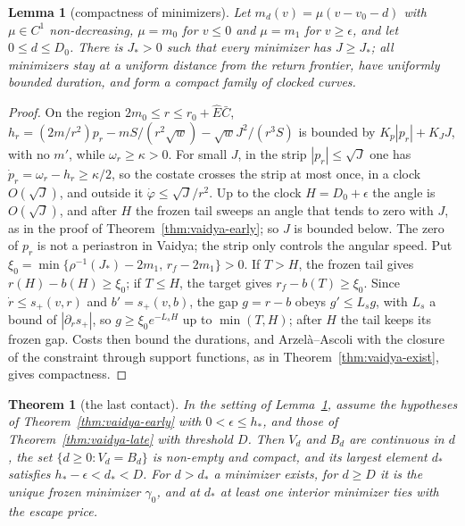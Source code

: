 \documentclass[aip,jmp,amsmath,amssymb,reprint]{revtex4-2}
\newcommand{\Ehat}{\hat E}
\theoremstyle{plain}
\newtheorem{theorem}{Theorem}
\newtheorem{lemma}[proposition]{Lemma}
\theoremstyle{definition}
\begin{document}
\begin{lemma}[compactness of minimizers]\label{lem:vaidya-compact}
Let $m_d(v)=\mu(v-v_0-d)$ with $\mu\in C^1$ non-decreasing, $\mu=m_0$ for $v\le0$ and $\mu=m_1$ for $v\ge\epsilon$, and
let $0\le d\le D_0$. There is $J_*>0$ such that every minimizer has $J\ge J_*$; all minimizers stay at a uniform
distance from the return frontier, have uniformly bounded duration, and form a compact family of clocked
curves.
\end{lemma}

\begin{proof}
On the region $2m_0\le r\le r_0+\Ehat\bar C$,
$h_r=(2m/r^2)p_r-mS/(r^2\sqrt w)-\sqrt wJ^2/(r^3S)$ is bounded by $K_p|p_r|+K_JJ$, with no $m'$, while
$\omega_r\ge\kappa>0$. For small $J$, in the strip $|p_r|\le\sqrt J$ one has $\dot p_r=\omega_r-h_r\ge\kappa/2$, so the
costate crosses the strip at most once, in a clock $O(\sqrt J)$, and outside it $\dot\varphi\le\sqrt J/r^2$. Up to the clock
$H=D_0+\epsilon$ the angle is $O(\sqrt J)$, and after $H$ the frozen tail sweeps an angle that tends to zero
with $J$, as in the proof of Theorem~\ref{thm:vaidya-early}; so $J$ is bounded below. The zero of $p_r$ is not
a periastron in Vaidya; the strip only controls the angular speed. Put
$\xi_0=\min\{\rho^{-1}(J_*)-2m_1,\,r_f-2m_1\}>0$. If $T>H$, the frozen tail gives $r(H)-b(H)\ge\xi_0$; if $T\le H$, the
target gives $r_f-b(T)\ge\xi_0$. Since $\dot r\le s_+(v,r)$ and $b'=s_+(v,b)$, the gap $g=r-b$ obeys $g'\le L_sg$, with
$L_s$ a bound of $|\partial_rs_+|$, so $g\ge\xi_0e^{-L_sH}$ up to $\min(T,H)$; after $H$ the tail keeps its frozen gap.
Costs then bound the durations, and Arzel\`a--Ascoli with the closure of the constraint through support
functions, as in Theorem~\ref{thm:vaidya-exist}, gives compactness.
\end{proof}

\begin{theorem}[the last contact]\label{thm:vaidya-contact}
In the setting of Lemma~\ref{lem:vaidya-compact}, assume the hypotheses of Theorem~\ref{thm:vaidya-early} with
$0<\epsilon\le h_*$, and those of Theorem~\ref{thm:vaidya-late} with threshold $D$. Then $V_d$ and $B_d$ are
continuous in $d$, the set $\{d\ge0:V_d=B_d\}$ is non-empty and compact, and its largest element $d_*$ satisfies
$h_*-\epsilon<d_*<D$. For $d>d_*$ a minimizer exists, for $d\ge D$ it is the unique frozen minimizer $\gamma_0$, and at
$d_*$ at least one interior minimizer ties with the escape price.
\end{theorem}
\end{document}
